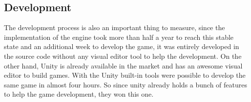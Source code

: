 \subsection{Development}
The development process is also an important thing to measure, since the implementation of the engine took more than half a year to reach this stable state and an additional week to develop the game, it was entirely developed in the source code without any visual editor tool to help the development. On the other hand, Unity is already available in the market and has an awesome visual editor to build games. With the Unity built-in tools were possible to develop the same game in almost four hours. So since unity already holds a bunch of features to help the game development, they won this one.